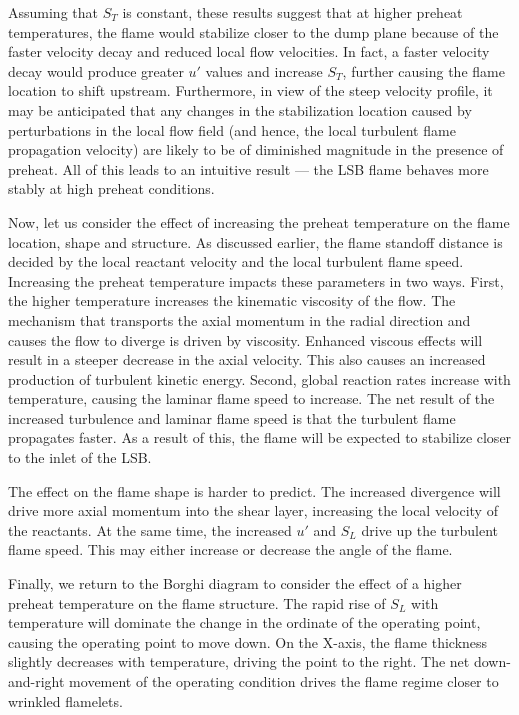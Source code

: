 Assuming that \(S_T\) is constant, these results suggest that at higher preheat temperatures, the flame would stabilize closer to the dump plane because of the faster velocity decay and reduced local flow velocities.
In fact, a faster velocity decay would produce greater \(u'\) values and increase \(S_T\), further causing the flame location to shift upstream.
Furthermore, in view of the steep velocity profile, it may be anticipated that any changes in the stabilization location caused by perturbations in the local flow field (and hence, the local turbulent flame propagation velocity) are likely to be of diminished magnitude in the presence of preheat.
All of this leads to an intuitive result --- the LSB flame behaves more stably at high preheat conditions.

Now, let us consider the effect of increasing the preheat temperature on the flame location, shape and structure.
As discussed earlier, the flame standoff distance is decided by the local reactant velocity and the local turbulent flame speed.
Increasing the preheat temperature impacts these parameters in two ways.
First, the higher temperature increases the kinematic viscosity of the flow.
The mechanism that transports the axial momentum in the radial direction and causes the flow to diverge is driven by viscosity.
Enhanced viscous effects will result in a steeper decrease in the axial velocity.
This also causes an increased production of turbulent kinetic energy.
Second, global reaction rates increase with temperature, causing the laminar flame speed to increase.
The net result of the increased turbulence and laminar flame speed is that the turbulent flame propagates faster.
As a result of this, the flame will be expected to stabilize closer to the inlet of the LSB.

The effect on the flame shape is harder to predict.
The increased divergence will drive more axial momentum into the shear layer, increasing the local velocity of the reactants.
At the same time, the increased \(u'\) and \(S_L\) drive up the turbulent flame speed.
This may either increase or decrease the angle of the flame.

Finally, we return to the Borghi diagram to consider the effect of a higher preheat temperature on the flame structure.
The rapid rise of \(S_L\) with temperature will dominate the change in the ordinate of the operating point, causing the operating point to move down.
On the X-axis, the flame thickness slightly decreases with temperature, driving the point to the right.
The net down-and-right movement of the operating condition drives the flame regime closer to wrinkled flamelets.

